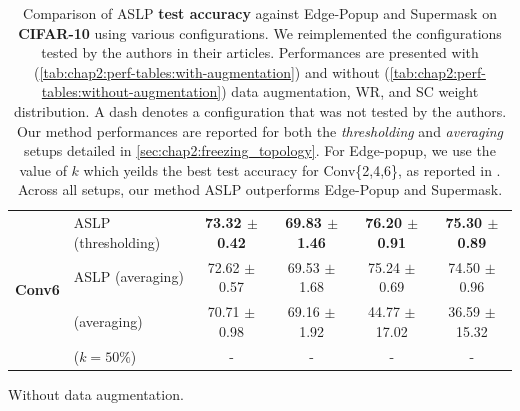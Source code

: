 \begin{table}[htbp]
\begin{subtable}[t]{\textwidth}
{\begin{tabular}{llcccc}
        \midrule
        \multirow{4}{*}{\textbf{Conv6}}                    & \ac{ASLP} (thresholding)                              & \textbf{73.32 $\pm$ 0.42} & \textbf{69.83 $\pm$ 1.46}  & \textbf{76.20 $\pm$ 0.91} & \textbf{75.30 $\pm$ 0.89} \\
                                                           & \ac{ASLP} (averaging)                                 & 72.62 $\pm$ 0.57          & 69.53 $\pm$ 1.68           & 75.24 $\pm$ 0.69          & 74.50 $\pm$ 0.96          \\
                                                           & \cite{DBLP:conf/nips/ZhouLLY19} (averaging)      & 70.71 $\pm$ 0.98          & 69.16 $\pm$ 1.92           & 44.77 $\pm$ 17.02         & 36.59 $\pm$ 15.32         \\
                                                           & \cite{DBLP:conf/cvpr/RamanujanWKFR20} ($k=50\%$) & -                         & -                          & -                         & -                         \\
        \bottomrule
      \end{tabular}
    }
    \caption{Without data augmentation.}
    \label{tab:chap2:perf-tables:without-augmentation}
  \end{subtable}
  \caption{Comparison of \ac{ASLP} \textbf{test accuracy} against Edge-Popup and
    Supermask \cite{DBLP:conf/cvpr/RamanujanWKFR20,DBLP:conf/nips/ZhouLLY19} on
    \textbf{CIFAR-10} using various configurations. We reimplemented the
    configurations tested by the authors in their articles. Performances are
    presented with (\cref{tab:chap2:perf-tables:with-augmentation}) and without
    (\cref{tab:chap2:perf-tables:without-augmentation}) data augmentation,
    \acf{WR}, and \acf{SC} weight distribution. A dash denotes a configuration
    that was not tested by the authors. Our method performances are reported for
    both the \textit{thresholding} and \textit{averaging} setups detailed in
    \cref{sec:chap2:freezing_topology}. For Edge-popup, we use the value of $k$
    which yeilds the best test accuracy for Conv\{2,4,6\}, as reported in
    \cite{DBLP:conf/cvpr/RamanujanWKFR20}. Across all setups, our method ASLP
    outperforms Edge-Popup and Supermask.}
  \label{tab:chap2:con_performances_comparison_cifar10}

\end{table}


